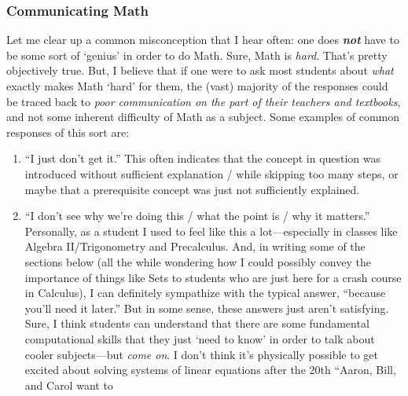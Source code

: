 \documentclass[10pt]{article}
\theoremstyle{definition}
\begin{document}
{%
\subsubsection{Communicating Math}
Let me clear up a common misconception that I hear often: one does
\emph{\textbf{not}} have to be some sort of `genius' in order to do
Math.  Sure, Math is \emph{hard}.  That's pretty objectively true.
But, I believe that if one were to ask most students about \emph{what}
exactly makes Math `hard' for them, the (vast) majority of the
responses could be traced back to \emph{poor communication on the part
  of their teachers and textbooks}, and not some inherent difficulty
of Math as a subject.  Some examples of common responses of this sort
are:
\begin{enumerate}
    \item ``I just don't get it.''  This often indicates that the
      concept in question was introduced without sufficient
      explanation / while skipping too many steps, or maybe that a
      prerequisite concept was just not sufficiently explained.
    \item ``I don't see why we're doing this / what the point is / why
      it matters.''  Personally, as a student I used to feel like this
      a lot---especially in classes like Algebra II/Trigonometry and
      Precalculus.  And, in writing some of the sections below (all
      the while wondering how I could possibly convey the importance
      of things like Sets to students who are just here for a crash
      course in Calculus), I can definitely sympathize with the
      typical answer, ``because you'll need it later.''  But in some
      sense, these answers just aren't satisfying.  Sure, I think
      students can understand that there are some fundamental
      computational skills that they just `need to know' in order to
      talk about cooler subjects---but \emph{come on}.  I don't think
      it's physically possible to get excited about solving systems of
      linear equations after the 20th ``Aaron, Bill, and Carol want to

\end{enumerate}}
\end{document}
